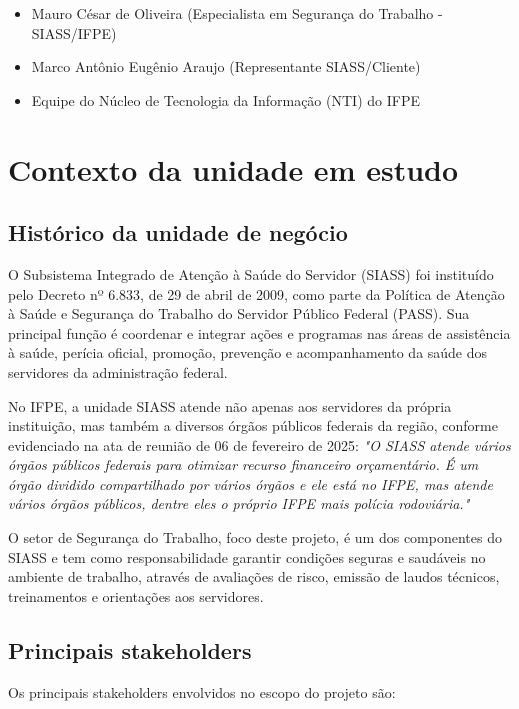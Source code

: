 \documentclass[12pt,a4paper]{article}
\begin{document}
\pagebreak

\begin{itemize}
    \item Mauro César de Oliveira (Especialista em Segurança do Trabalho - SIASS/IFPE)
    \item Marco Antônio Eugênio Araujo (Representante SIASS/Cliente)
    \item Equipe do Núcleo de Tecnologia da Informação (NTI) do IFPE
\end{itemize}

\section{Contexto da unidade em estudo}

\subsection{Histórico da unidade de negócio}
O Subsistema Integrado de Atenção à Saúde do Servidor (SIASS) foi instituído pelo Decreto nº 6.833, de 29 de abril de 2009, como parte da Política de Atenção à Saúde e Segurança do Trabalho do Servidor Público Federal (PASS). Sua principal função é coordenar e integrar ações e programas nas áreas de assistência à saúde, perícia oficial, promoção, prevenção e acompanhamento da saúde dos servidores da administração federal.

No IFPE, a unidade SIASS atende não apenas aos servidores da própria instituição, mas também a diversos órgãos públicos federais da região, conforme evidenciado na ata de reunião de 06 de fevereiro de 2025: \textit{"O SIASS atende vários órgãos públicos federais para otimizar recurso financeiro orçamentário. É um órgão dividido compartilhado por vários órgãos e ele está no IFPE, mas atende vários órgãos públicos, dentre eles o próprio IFPE mais polícia rodoviária."} 

O setor de Segurança do Trabalho, foco deste projeto, é um dos componentes do SIASS e tem como responsabilidade garantir condições seguras e saudáveis no ambiente de trabalho, através de avaliações de risco, emissão de laudos técnicos, treinamentos e orientações aos servidores.

\subsection{Principais stakeholders}
Os principais stakeholders envolvidos no escopo do projeto são:
\end{document}
